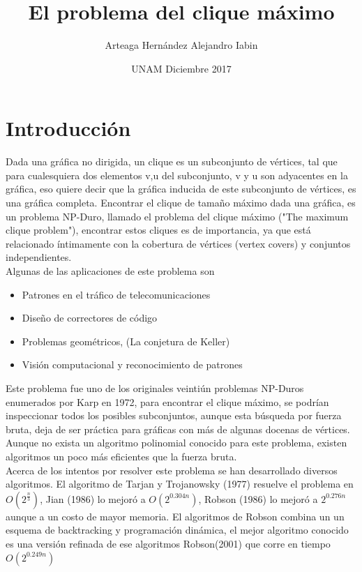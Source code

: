 \documentclass{article}
\title{El problema del clique máximo}
\author{Arteaga Hernández Alejandro Iabin}
\date{UNAM Diciembre 2017}
\begin{document}
\maketitle

\section{Introducción}
Dada una gráfica no dirigida, un clique es un subconjunto de vértices, tal que para cualesquiera dos elementos v,u del subconjunto, v y u son adyacentes en la gráfica, eso quiere decir que la gráfica inducida de este subconjunto de vértices, es una gráfica completa. Encontrar el clique de tamaño máximo dada una gráfica, es un problema NP-Duro, llamado el problema del clique máximo ("The maximum clique problem"), encontrar estos cliques es de importancia, ya que está relacionado íntimamente con la cobertura de vértices (vertex covers) y conjuntos independientes.\\

Algunas de las aplicaciones de este problema son
\begin{itemize}
   \item Patrones en el tráfico de telecomunicaciones
   \item Diseño de correctores de código
   \item Problemas geométricos, (La conjetura de Keller)
   \item Visión computacional y reconocimiento de patrones
\end{itemize}  

Este problema fue uno de los originales veintiún problemas NP-Duros enumerados por Karp en 1972, para encontrar el clique máximo, se podrían inspeccionar todos los posibles subconjuntos, aunque esta búsqueda por fuerza bruta, deja de ser práctica para gráficas con más de algunas docenas de vértices. Aunque no exista un algoritmo polinomial conocido para este problema, existen algoritmos un poco más eficientes que la fuerza bruta.\\

    Acerca de los intentos por resolver este problema se han desarrollado diversos
algoritmos. El algoritmo de Tarjan y Trojanowsky (1977) resuelve el problema en 
$O(2^{\frac{n}{3}})$, Jian (1986) lo mejoró a $O(2^{0.304n})$, Robson (1986) lo mejoró a $2^{0.276n}$ aunque a un costo de mayor memoria. El algoritmos de Robson combina un un esquema de backtracking y programación dinámica, el mejor algoritmo conocido es una versión refinada de ese algoritmos Robson(2001) que corre en tiempo $O(2^{0.249n})$\\
\end{document}
